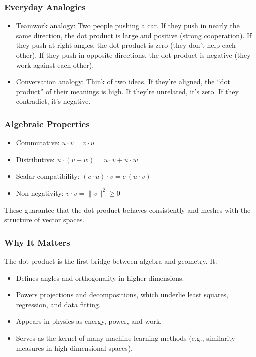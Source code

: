 \documentclass[
  letterpaper,
  DIV=11,
  numbers=noendperiod]{scrreprt}
\providecommand{\tightlist}{%
  \setlength{\itemsep}{0pt}\setlength{\parskip}{0pt}}
\begin{document}
\subsubsection{Everyday Analogies}\label{everyday-analogies-3}

\begin{itemize}
\tightlist
\item
  Teamwork analogy: Two people pushing a car. If they push in nearly the
  same direction, the dot product is large and positive (strong
  cooperation). If they push at right angles, the dot product is zero
  (they don't help each other). If they push in opposite directions, the
  dot product is negative (they work against each other).
\item
  Conversation analogy: Think of two ideas. If they're aligned, the
  ``dot product'' of their meanings is high. If they're unrelated, it's
  zero. If they contradict, it's negative.
\end{itemize}

\subsubsection{Algebraic Properties}\label{algebraic-properties-3}

\begin{itemize}
\tightlist
\item
  Commutative: \(u \cdot v = v \cdot u\)\\
\item
  Distributive: \(u \cdot (v + w) = u \cdot v + u \cdot w\)\\
\item
  Scalar compatibility: \((c \cdot u) \cdot v = c \,(u \cdot v)\)\\
\item
  Non-negativity: \(v \cdot v = \|v\|^2 \geq 0\)
\end{itemize}

These guarantee that the dot product behaves consistently and meshes
with the structure of vector spaces.

\subsubsection{Why It Matters}\label{why-it-matters-5}

The dot product is the first bridge between algebra and geometry. It:

\begin{itemize}
\tightlist
\item
  Defines angles and orthogonality in higher dimensions.
\item
  Powers projections and decompositions, which underlie least squares,
  regression, and data fitting.
\item
  Appears in physics as energy, power, and work.
\item
  Serves as the kernel of many machine learning methods (e.g.,
  similarity measures in high-dimensional spaces).
\end{itemize}
\end{document}

